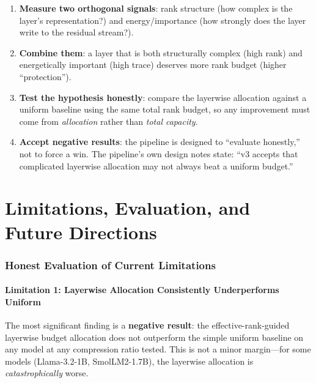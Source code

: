 \documentclass[11pt]{article}
\begin{document}
\begin{enumerate}
    \item \textbf{Measure two orthogonal signals}: rank structure (how complex is the layer's representation?) and energy/importance (how strongly does the layer write to the residual stream?).
    \item \textbf{Combine them}: a layer that is both structurally complex (high rank) and energetically important (high trace) deserves more rank budget (higher ``protection'').
    \item \textbf{Test the hypothesis honestly}: compare the layerwise allocation against a uniform baseline using the same total rank budget, so any improvement must come from \emph{allocation} rather than \emph{total capacity}.
    \item \textbf{Accept negative results}: the pipeline is designed to ``evaluate honestly,'' not to force a win.  The pipeline's own design notes state: ``v3 accepts that complicated layerwise allocation may not always beat a uniform budget.''
\end{enumerate}

\part{Limitations, Evaluation, and Future Directions}

\section{Honest Evaluation of Current Limitations}

\subsection{Limitation 1: Layerwise Allocation Consistently Underperforms Uniform}

The most significant finding is a \textbf{negative result}: the effective-rank-guided layerwise budget allocation does not outperform the simple uniform baseline on any model at any compression ratio tested.  This is not a minor margin---for some models (Llama-3.2-1B, SmolLM2-1.7B), the layerwise allocation is \emph{catastrophically} worse.
\end{document}
